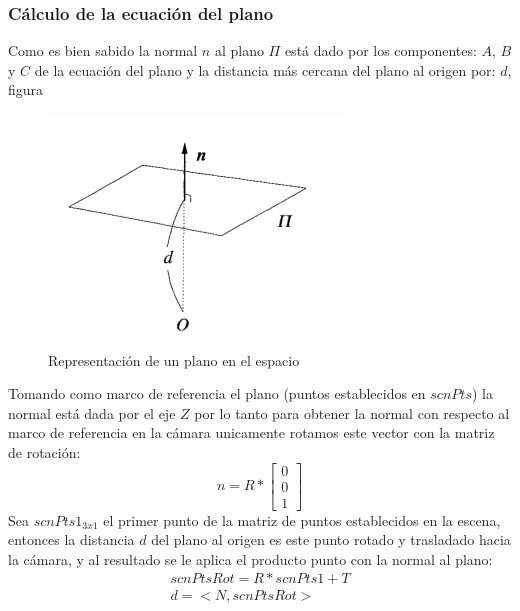        	\subsubsection{Cálculo de la ecuación del plano}
       	Como es bien sabido la normal  $n$ al plano $\Pi$ está dado por los componentes: $A$, $B$ y $C$ de la ecuación del plano y la distancia más cercana del plano al origen por: $d$, figura
       	
       	\begin{figure}[htbp]
       		\centering
       		\includegraphics[width=.4\textwidth]{./pictures/plane}
       		\caption{Representación de un plano en el espacio}\label{fig: figura}
       	\end{figure}
       	Tomando como marco de referencia el plano (puntos establecidos en $scnPts$) la normal está dada por el eje $Z$ por lo tanto para obtener la normal con respecto al marco de referencia en la cámara unicamente rotamos este vector con la matriz de rotación:
       	\[n=R*\begin{bmatrix}
       	0\\
       	0\\
       	1	
       	\end{bmatrix}\]
       	Sea $scnPts1_{3x1}$ el primer punto de la matriz de puntos establecidos en la escena, entonces la distancia $d$ del plano al origen es este punto rotado y trasladado hacia la cámara, y al resultado se le aplica el producto punto con la normal al plano:
       	\begin{eqnarray}
       	scnPtsRot=R*scnPts1+T\\
       	d=<N,scnPtsRot>
       	\end{eqnarray}
       	
